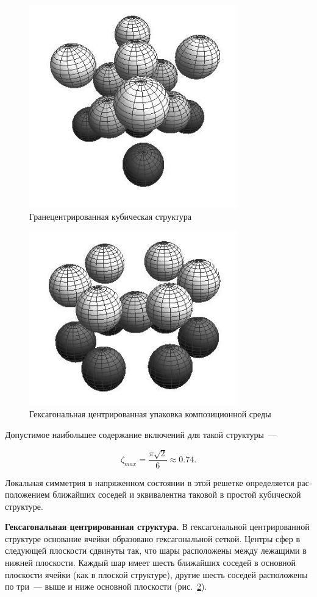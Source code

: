 \begin{russian}
\begin{figure}[h!]
\centering
\includegraphics[width=9cm]{cav-14.jpg}
\caption{Гранецентрированная кубическая структура}
\label{f:8:3}
\end{figure}

\begin{figure}[h!]
\centering
\includegraphics[width=9cm]{cav-13.jpg}
\caption{Гексагональная центрированная упаковка композиционной среды}
\label{f:8:4}
\end{figure}

Допустимое наибольшее содержание включений для такой структуры~---

$$
\zeta_{max}=\frac{\pi\sqrt{2}}{6}\approx 0.74.
$$

Локальная симметрия в напряженном состоянии в этой решетке определяется расположением ближайших соседей и эквивалентна таковой в простой кубической структуре.

\textbf{Гексагональная центрированная структура.} В гексагональной центрированной структуре основание ячейки образовано гексагональной сеткой. Центры сфер в следующей плоскости сдвинуты так, что шары расположены между лежащими в нижней плоскости. Каждый шар имеет шесть ближайших соседей в основной плоскости ячейки (как в плоской структуре), другие шесть соседей расположены по три~--- выше и ниже основной плоскости (рис.~\ref{f:8:4}).


\end{russian}
